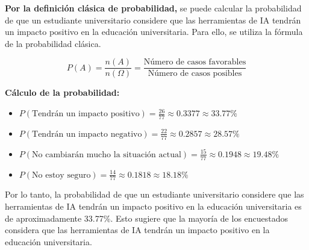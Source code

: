 \textbf{Por la definición clásica de probabilidad,} se puede calcular la probabilidad de que un estudiante universitario considere que las herramientas de IA tendrán un impacto positivo en la educación universitaria. Para ello, se utiliza la fórmula de la probabilidad clásica.

\begin{equation*}
  P(A) = \frac{n(A)}{n(\Omega)} = \dfrac{\text{Número de casos favorables}}{\text{Número de casos posibles}}
\end{equation*}

\textbf{Cálculo de la probabilidad:}

\begin{itemize}
  \item $P(\text{Tendrán un impacto positivo}) = \frac{26}{77} \approx 0.3377 \approx 33.77\%$
  \item $P(\text{Tendrán un impacto negativo}) = \frac{22}{77} \approx 0.2857 \approx 28.57\%$
  \item $P(\text{No cambiarán mucho la situación actual}) = \frac{15}{77} \approx 0.1948 \approx 19.48\%$
  \item $P(\text{No estoy seguro}) = \frac{14}{77} \approx 0.1818 \approx 18.18\%$
\end{itemize}

Por lo tanto, la probabilidad de que un estudiante universitario considere que las herramientas de IA tendrán un impacto positivo en la educación universitaria es de aproximadamente 33.77\%. Esto sugiere que la mayoría de los encuestados considera que las herramientas de IA tendrán un impacto positivo en la educación universitaria.
